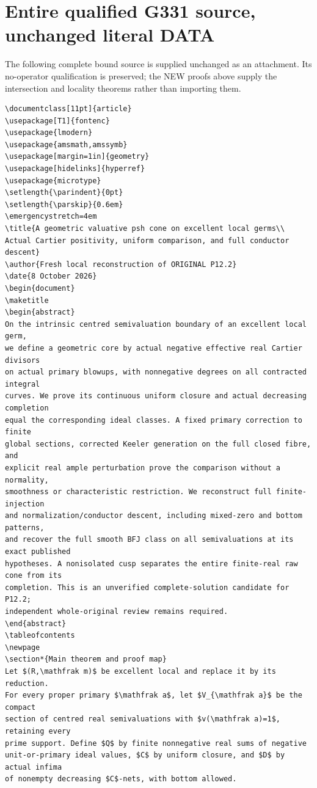 \documentclass[11pt]{article}
\begin{document}
\section{Entire qualified G331 source, unchanged literal DATA}
The following complete bound source is supplied unchanged as an attachment.
Its no-operator qualification is preserved; the NEW proofs above supply the
intersection and locality theorems rather than importing them.
\begin{Verbatim}[breaklines,fontsize=\tiny]
\documentclass[11pt]{article}
\usepackage[T1]{fontenc}
\usepackage{lmodern}
\usepackage{amsmath,amssymb}
\usepackage[margin=1in]{geometry}
\usepackage[hidelinks]{hyperref}
\usepackage{microtype}
\setlength{\parindent}{0pt}
\setlength{\parskip}{0.6em}
\emergencystretch=4em
\title{A geometric valuative psh cone on excellent local germs\\
Actual Cartier positivity, uniform comparison, and full conductor descent}
\author{Fresh local reconstruction of ORIGINAL P12.2}
\date{8 October 2026}
\begin{document}
\maketitle
\begin{abstract}
On the intrinsic centred semivaluation boundary of an excellent local germ,
we define a geometric core by actual negative effective real Cartier divisors
on actual primary blowups, with nonnegative degrees on all contracted integral
curves. We prove its continuous uniform closure and actual decreasing completion
equal the corresponding ideal classes. A fixed primary correction to finite
global sections, corrected Keeler generation on the full closed fibre, and
explicit real ample perturbation prove the comparison without a normality,
smoothness or characteristic restriction. We reconstruct full finite-injection
and normalization/conductor descent, including mixed-zero and bottom patterns,
and recover the full smooth BFJ class on all semivaluations at its exact published
hypotheses. A nonisolated cusp separates the entire finite-real raw cone from its
completion. This is an unverified complete-solution candidate for P12.2;
independent whole-original review remains required.
\end{abstract}
\tableofcontents
\newpage
\section*{Main theorem and proof map}
Let $(R,\mathfrak m)$ be excellent local and replace it by its reduction.
For every proper primary $\mathfrak a$, let $V_{\mathfrak a}$ be the compact
section of centred real semivaluations with $v(\mathfrak a)=1$, retaining every
prime support. Define $Q$ by finite nonnegative real sums of negative
unit-or-primary ideal values, $C$ by uniform closure, and $D$ by actual infima
of nonempty decreasing $C$-nets, with bottom allowed.


\end{Verbatim}
\end{document}
